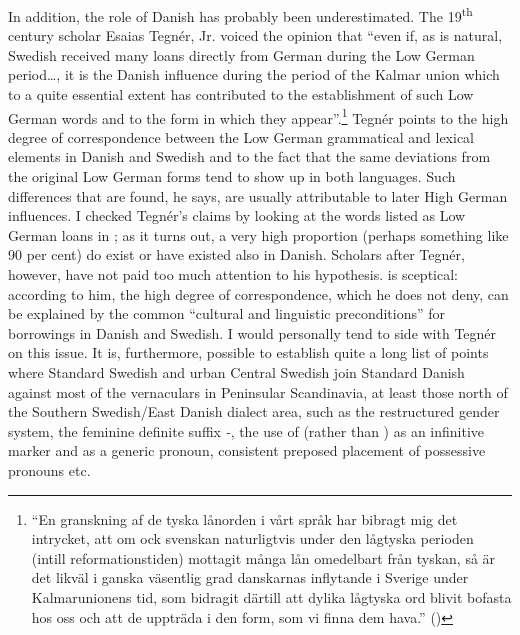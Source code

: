 In addition, the role of Danish has probably been underestimated. The 19\textsuperscript{th} century scholar Esaias Tegnér, Jr. voiced the opinion that “even if, as is natural, Swedish received many loans directly from German during the Low German period…, it is the Danish influence during the period of the Kalmar union which to a quite essential extent has contributed to the establishment of such Low German words and to the form in which they appear”.\footnote{ “En granskning af de tyska lånorden i vårt språk har bibragt mig det intrycket, att om ock svenskan naturligtvis under den lågtyska perioden (intill reformationstiden) mottagit många lån omedelbart från tyskan, så är det likväl i ganska väsentlig grad danskarnas inflytande i Sverige under Kalmarunionens tid, som bidragit därtill att dylika lågtyska ord blivit bofasta hos oss och att de uppträda i den form, som vi finna dem hava.” (\citet[159]{Tegnér1889})} Tegnér points to the high degree of correspondence between the Low German grammatical and lexical elements in Danish and Swedish and to the fact that the same deviations from the original Low German forms tend to show up in both languages. Such differences that are found, he says, are usually attributable to later High German influences. I checked Tegnér’s claims by looking at the words listed as Low German loans in \citet{Hellquist1922}; as it turns out, a very high proportion (perhaps something like 90 per cent) do exist or have existed also in Danish. Scholars after Tegnér, however, have not paid too much attention to his hypothesis. \citet{Wessén1954} is sceptical: according to him, the high degree of correspondence, which he does not deny, can be explained by the common “cultural and linguistic preconditions” for borrowings in Danish and Swedish. I would personally tend to side with Tegnér on this issue. It is, furthermore, possible to establish quite a long list of points where Standard Swedish and urban Central Swedish join Standard Danish against most of the vernaculars in Peninsular Scandinavia, at least those north of the Southern Swedish/East Danish dialect area, such as the restructured gender system, the feminine definite suffix\textit{ {}-}, the use of  (rather than ) as an infinitive marker and  as a generic pronoun, consistent preposed placement of possessive pronouns etc. 

